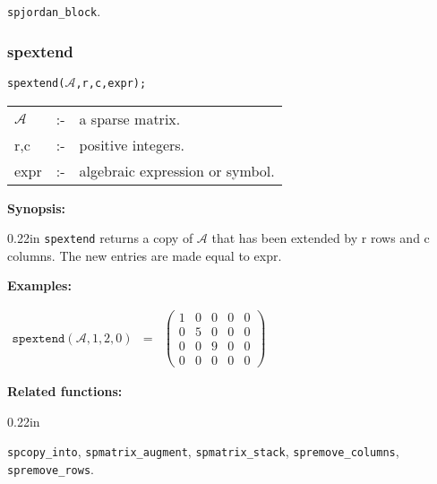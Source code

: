 \hspace*{0.175in} \texttt{spjordan\_block}.


\subsubsection{spextend}

\hspace*{0.175in} \texttt{spextend($\mathcal{A}$,r,c,expr);}

\hspace*{0.1in} 
\begin{tabular}{l l l}
$\mathcal{A}$ &:-& a sparse matrix. \\
r,c        &:-& positive integers. \\
expr      &:-& algebraic expression or symbol.
\end{tabular}

\textbf{Synopsis:} 

\begin{addtolength}{\leftskip}{0.22in}
                \texttt{spextend} returns a copy of $\mathcal{A}$ that has been 
                extended by r rows and c columns. The new entries are
                made equal to expr.

\end{addtolength}

\textbf{Examples:}

\begin{flushleft}  
\hspace*{0.1in}
\begin{math}  
\begin{array}{ccc}
\texttt{spextend}(\mathcal{A},1,2,0) & = & 
\left( \begin{array}{ccccc} 1 & 0 & 0 & 0 & 0 \\ 0 & 5 & 0 & 0 & 0
\\ 0 & 0 & 9 & 0 & 0 \\ 0 & 0 & 0 & 0 & 0 
\end{array} \right)
\end{array}
\end{math}  
\end{flushleft}

\textbf{Related functions:} 

\begin{addtolength}{\leftskip}{0.22in}
\parbox[t]{0.95\linewidth}{\texttt{spcopy\_into}, \texttt{spmatrix\_augment}, 
\texttt{spmatrix\_stack}, \texttt{spremove\_columns}, \texttt{spremove\_rows}.}

\end{addtolength}


